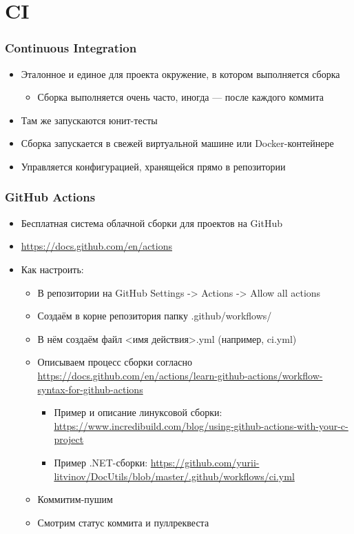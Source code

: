 \documentclass{../../slides-style}
\begin{document}
    \section{CI}

    \begin{frame}
        \frametitle{Continuous Integration}
        \begin{itemize}
            \item Эталонное и единое для проекта окружение, в котором выполняется сборка
            \begin{itemize}
                \item Сборка выполняется очень часто, иногда --- после каждого коммита
            \end{itemize}
            \item Там же запускаются юнит-тесты
            \item Сборка запускается в свежей виртуальной машине или Docker-контейнере
            \item Управляется конфигурацией, хранящейся прямо в репозитории
        \end{itemize}
    \end{frame}

    \begin{frame}
        \frametitle{GitHub Actions}
        \begin{itemize}
            \item Бесплатная система облачной сборки для проектов на GitHub
            \item \url{https://docs.github.com/en/actions}
            \item Как настроить:
            \begin{itemize}
                \item В репозитории на GitHub Settings -> Actions -> Allow all actions
                \item Создаём в корне репозитория папку .github/workflows/
                \item В нём создаём файл <имя действия>.yml (например, ci.yml)
                \item Описываем процесс сборки согласно \url{https://docs.github.com/en/actions/learn-github-actions/workflow-syntax-for-github-actions}
                \begin{itemize}
                    \item Пример и описание линуксовой сборки: \url{https://www.incredibuild.com/blog/using-github-actions-with-your-c-project}
                    \item Пример .NET-сборки: \url{https://github.com/yurii-litvinov/DocUtils/blob/master/.github/workflows/ci.yml}
                \end{itemize}
                \item Коммитим-пушим
                \item Смотрим статус коммита и пуллреквеста
            \end{itemize}
        \end{itemize}
    \end{frame}
\end{document}

